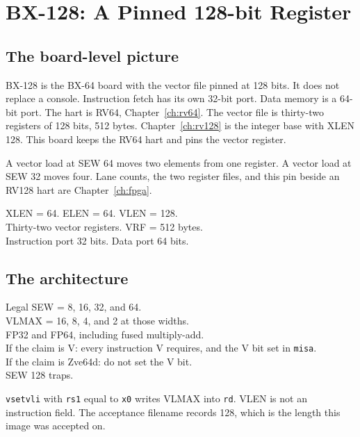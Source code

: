 \chapter{BX-128: A Pinned 128-bit Register}
\label{ch:bx128}

\section{The board-level picture}

BX-128 is the BX-64 board with the vector file pinned at 128 bits. It does not replace a console. Instruction fetch has its own 32-bit port. Data memory is a 64-bit port. The hart is RV64, Chapter~\ref{ch:rv64}. The vector file is thirty-two registers of 128 bits, 512 bytes. Chapter~\ref{ch:rv128} is the integer base with XLEN 128. This board keeps the RV64 hart and pins the vector register.

A vector load at SEW 64 moves two elements from one register. A vector load at SEW 32 moves four. Lane counts, the two register files, and this pin beside an RV128 hart are Chapter~\ref{ch:fpga}.

\begin{spec}
XLEN = 64. ELEN = 64. VLEN = 128.\\
Thirty-two vector registers. VRF = 512 bytes.\\
Instruction port 32 bits. Data port 64 bits.
\end{spec}

\section{The architecture}

\begin{spec}
Legal SEW = 8, 16, 32, and 64.\\
VLMAX = 16, 8, 4, and 2 at those widths.\\
FP32 and FP64, including fused multiply-add.\\
If the claim is V: every instruction V requires, and the V bit set in \texttt{misa}.\\
If the claim is Zve64d: do not set the V bit.\\
SEW 128 traps.
\end{spec}

\texttt{vsetvli} with \texttt{rs1} equal to \texttt{x0} writes VLMAX into \texttt{rd}. VLEN is not an instruction field. The acceptance filename records 128, which is the length this image was accepted on.

